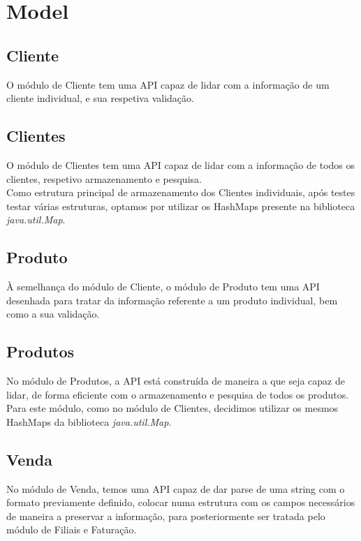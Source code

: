 \documentclass[a4paper]{report}
\begin{document}
\section{Model}

\subsection{Cliente}

O módulo de Cliente tem uma API capaz de lidar com a informação de um cliente
individual, e sua respetiva validação. 

\subsection{Clientes}

O módulo de Clientes tem uma API capaz de lidar com a informação de todos os
clientes, respetivo armazenamento e pesquisa. \\ 
Como estrutura principal de armazenamento dos Clientes individuais, após testes 
testar várias estruturas, optamos por utilizar os HashMaps presente na biblioteca
\textit{java.util.Map}.

\subsection{Produto}

À semelhança do módulo de Cliente, o módulo de Produto tem uma API desenhada
para tratar da informação referente a um produto individual, bem como a sua 
validação.

\subsection{Produtos}

No módulo de Produtos, a API está construída de maneira a que seja capaz de
lidar, de forma eficiente com o armazenamento e pesquisa de todos os produtos.\\
Para este módulo, como no módulo de Clientes, decidimos utilizar os mesmos HashMaps
da biblioteca \textit{java.util.Map}.

\subsection{Venda}

No módulo de Venda, temos uma API capaz de dar parse de uma string com o formato 
previamente definido, colocar numa estrutura com os campos necessários de maneira
a preservar a informação, para posteriormente ser tratada pelo módulo de Filiais e
Faturação.
\end{document}
